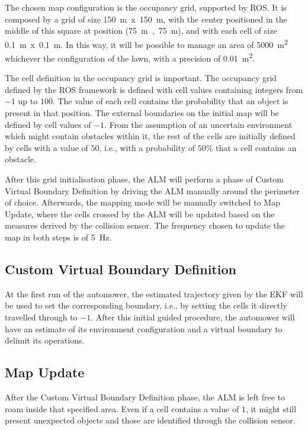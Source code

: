 \noindent The chosen map configuration is the occupancy grid, supported by \gls{ROS}. 
It is composed by a grid of size \SI{150}{m}~x~\SI{150}{m}, with the center positioned in the middle of this square at position (\SI{75}{m}~,~\SI{75}{m}), and with each cell of size \SI{0.1}{m}~x~\SI{0.1}{m}. 
In this way, it will be possible to manage an area of \SI{5000}{m^2} whichever the configuration of the lawn, with a precision of \SI{0.01}{m^2}.

The cell definition in the occupancy grid is important. The occupancy grid defined by the \gls{ROS} framework is defined with cell values containing integers from $-1$ up to $100$.
The value of each cell contains the probability that an object is present in that position.
The external boundaries on the initial map will be defined by cell values of $-1$.
From the assumption of an uncertain environment which might contain obstacles within it, the rest of the cells are initially defined by cells with a value of $50$, i.e., with a probability of $50\%$ that a cell contains an obstacle.

After this grid initialisation phase, the \gls{ALM} will perform a phase of Custom Virtual Boundary Definition by driving the \gls{ALM} manually around the perimeter of choice.
Afterwards, the mapping mode will be manually switched to Map Update, where the cells crossed by the \gls{ALM} will be updated based on the measures derived by the collision sensor.
The frequency chosen to update the map in both steps is of \SI{5}{Hz}.


\subsection{Custom Virtual Boundary Definition}
\noindent
At the first run of the automower, the estimated trajectory given by the \gls{EKF} will be used to set the corresponding boundary, i.e., by setting the cells it directly travelled through to $-1$.
After this initial guided procedure, the automower will have an estimate of its environment configuration and a virtual boundary to delimit its operations.

\subsection{Map Update}
\noindent
After the Custom Virtual Boundary Definition phase, the \gls{ALM} is left free to roam inside that specified area.
Even if a cell contains a value of $1$, it might still present unexpected objects and those are identified through the collision sensor.


